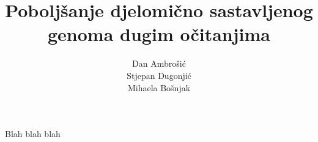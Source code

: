\documentclass[lmodern, utf8, zavrsni, numeric]{fer}
\begin{document}
\title{ Poboljšanje djelomično sastavljenog genoma dugim očitanjima}

\author{Dan Ambrošić \\Stjepan Dugonjić \\Mihaela Bošnjak}

\maketitle


\tableofcontents










\begin{sazetak}
Blah blah blah

\end{sazetak}
\end{document}
